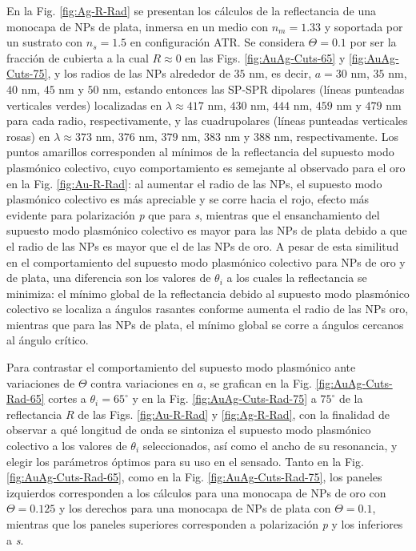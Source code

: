 En la Fig. \ref{fig:Ag-R-Rad}	 se presentan los cálculos de la reflectancia de una monocapa de NPs  de plata, inmersa en un medio con $n_m=1.33$ y soportada por un sustrato con $n_s=1.5$ en configuración ATR. Se considera  $\Theta=0.1$ por ser la fracción de cubierta a la cual $R\approx 0$ en las Figs. \ref{fig:AuAg-Cuts-65} y \ref{fig:AuAg-Cuts-75}, y los radios de las NPs alrededor de $35$ nm, es decir, $a=30$ nm, $35$ nm, $40$ nm, $45$ nm y $50$ nm, estando entonces las SP-SPR dipolares (líneas punteadas verticales verdes) localizadas en $\lambda\approx 417$ nm, $430$ nm, $444$ nm, $459$ nm y $479$ nm para cada radio, respectivamente, y las cuadrupolares (líneas punteadas verticales rosas) en $\lambda\approx 373$ nm, $376$ nm, $379$ nm, $383$ nm y $388$ nm, respectivamente. Los puntos amarillos corresponden al mínimos de la reflectancia del supuesto modo plasmónico colectivo, cuyo comportamiento es semejante al observado para el oro en la Fig. \ref{fig:Au-R-Rad}: al aumentar el radio de las NPs, el supuesto modo plasmónico colectivo es más apreciable y se corre hacia el rojo, efecto más evidente para polarización \emph{p} que para \emph{s}, mientras que el ensanchamiento del supuesto modo plasmónico colectivo es mayor para las NPs de plata debido a que el radio de las NPs es mayor que el de las NPs de oro. A pesar de esta similitud en el comportamiento del supuesto modo plasmónico colectivo para NPs de oro y de plata, una diferencia son los valores de $\theta_i$ a los cuales la reflectancia se minimiza: el mínimo global de la reflectancia debido al supuesto modo plasmónico colectivo se localiza a ángulos rasantes conforme aumenta el radio de las NPs oro, mientras que para las NPs de plata, el mínimo global se corre a ángulos cercanos al ángulo crítico.

Para contrastar el comportamiento del supuesto modo plasmónico ante variaciones de $\Theta$ contra variaciones en $a$,  se grafican en la Fig. \ref{fig:AuAg-Cuts-Rad-65} cortes a $\theta_i = 65^\circ$  y en la  Fig.  \ref{fig:AuAg-Cuts-Rad-75} a $75^\circ$ de la reflectancia $R$ de las Figs. \ref{fig:Au-R-Rad} y \ref{fig:Ag-R-Rad}, con la finalidad de observar a qué longitud de onda se sintoniza el supuesto modo plasmónico colectivo a los valores de $\theta_i$ seleccionados, así como el ancho de su resonancia, y elegir los parámetros óptimos para su uso en el sensado. Tanto en la Fig. \ref{fig:AuAg-Cuts-Rad-65}, como en la Fig. \ref{fig:AuAg-Cuts-Rad-75}, los paneles izquierdos corresponden a los cálculos para una monocapa de NPs de oro con $\Theta=0.125$ y los derechos para una monocapa de NPs de plata con $\Theta=0.1$, mientras que los paneles superiores corresponden a polarización \emph{p} y los inferiores a \emph{s}.

